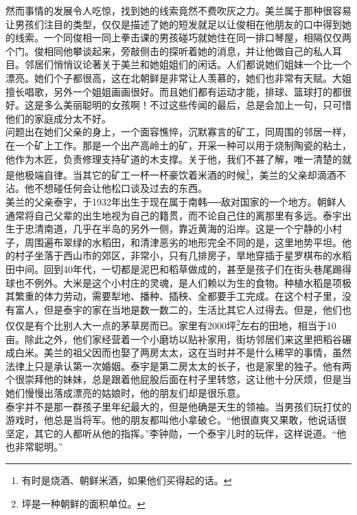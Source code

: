 然而事情的发展令人吃惊，找到她的线索竟然不费吹灰之力。美兰属于那种很容易让男孩们注目的类型，仅仅是描述了她的短发就足以让俊相在他朋友的口中得到她的线索。一个同俊相一同上拳击课的男孩碰巧就她住在同一排口琴屋，相隔仅仅两个门。俊相同他攀谈起来，旁敲侧击的探听着她的消息，并让他做自己的私人耳目。邻居们悄悄议论著关于美兰和她姐姐们的闲话。人们都说她们姐妹一个比一个漂亮。她们个子都很高，这在北朝鲜是非常让人羡慕的，她们也非常有天赋。大姐擅长唱歌，另外一个姐姐画画很好。而且她们都有运动才能，排球、篮球打的都很好。这是多么美丽聪明的女孩啊！不过这些传闻的最后，总是会加上一句，只可惜他们的家庭成分太不好。\\

问题出在她们父亲的身上，一个面容憔悴，沉默寡言的矿工，同周围的邻居一样，在一个矿上工作。那是一个出产高岭土的矿，开采一种可以用于烧制陶瓷的粘土，他作为木匠，负责修理支持矿道的木支撑。关于他，我们不甚了解，唯一清楚的就是他极端自律。当其它的矿工一杯一杯豪饮着米酒的时候\footnote{有时是烧酒、朝鲜米酒，如果他们买得起的话。}，美兰的父亲却滴酒不沾。他不想碰任何会让他松口谈及过去的东西。\\

美兰的父亲泰宇，于1932年出生于现在属于南韩──敌对国家的一个地方。朝鲜人通常将自己父辈的出生地视为自己的籍贯，而不论自己住的离那里有多远。泰宇出生于忠清南道，几乎在半岛的另外一侧，靠近黄海的沿岸。这是一个宁静的小村子，周围遍布翠绿的水稻田，和清津恶劣的地形完全不同的是，这里地势平坦。他的村子坐落于西山市的郊区，非常小，只有几排房子，旱地穿插于星罗棋布的水稻田中间。回到40年代，一切都是泥巴和稻草做成的，甚至是孩子们在街头巷尾踢得球也不例外。大米是这个小村庄的灵魂，是人们赖以为生的食物。种植水稻是项极其繁重的体力劳动，需要犁地、播种、插秧、全都要手工完成。在这个村子里，没有富人，但是泰宇的家在当地是数一数二的，生活比其它人过得去。但是，他们也仅仅是有个比别人大一点的茅草房而已。家里有2000坪\footnote{坪是一种朝鲜的面积单位。}左右的田地，相当于10亩。除此之外，他们家经营着一个小磨坊以贴补家用，街坊邻居们来这里把稻谷碾成白米。美兰的祖父因而也娶了两房太太，这在当时并不是什么稀罕的事情，虽然法律上只是承认第一次婚姻。泰宇是第二房太太的长子，也是家里的独子。他有两个很崇拜他的妹妹，总是跟着他屁股后面在村子里转悠，这让他十分厌烦，但是当她们慢慢出落成漂亮的姑娘时，他的朋友们却是很乐意。\\

泰宇并不是那一群孩子里年纪最大的，但是他确是天生的领袖。当男孩们玩打仗的游戏时，他总是当将军。他的朋友都叫他小拿破仑。“他很直爽又果敢，他说话很坚定，其它的人都听从他的指挥。”李钟勋，一个泰宇儿时的玩伴，这样说道。“他也非常聪明。”\\

